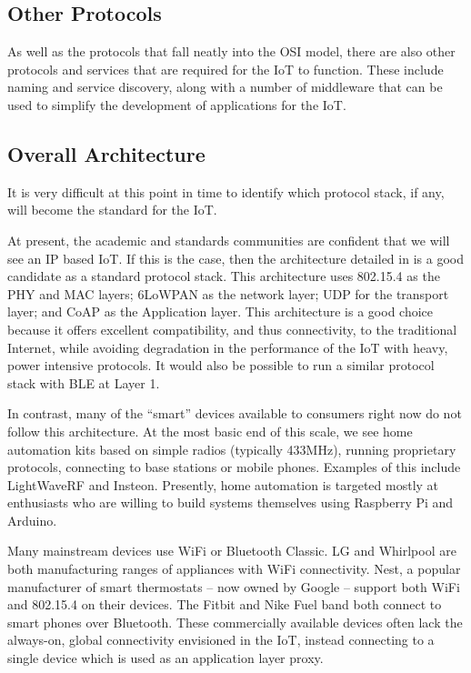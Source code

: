 \documentclass[10pt,journal,compsoc]{IEEEtran}
\begin{document}
\subsection{Other Protocols}
As well as the protocols that fall neatly into the OSI model, there are also
other protocols and services that are required for the IoT to function. These
include naming and service discovery, along with a number of middleware that
can be used to simplify the development of applications for the IoT.

\subsection{Overall Architecture}
It is very difficult at this point in time to identify which protocol stack, if
any, will become the standard for the IoT. 

At present, the academic and standards communities are confident that we will
see an IP based IoT. If this is the case, then the architecture detailed in
\cite{Palattella2013} is a good candidate as a standard protocol stack. This
architecture uses 802.15.4 as the PHY and MAC layers; 6LoWPAN as the network
layer; UDP for the transport layer; and CoAP as the Application layer. This
architecture is a good choice because it offers excellent compatibility, and
thus connectivity, to the traditional Internet, while avoiding degradation in
the performance of the IoT with heavy, power intensive protocols. It would also
be possible to run a similar protocol stack with BLE at Layer 1.  

In contrast, many of the ``smart'' devices available to consumers right now do
not follow this architecture. At the most basic end of this scale, we see home
automation kits based on simple radios (typically 433MHz), running proprietary
protocols, connecting to base stations or mobile phones. Examples of this
include LightWaveRF and Insteon. Presently, home automation is targeted mostly
at enthusiasts who are willing to build systems themselves using Raspberry Pi
and Arduino.  

Many mainstream devices use WiFi or Bluetooth Classic. LG and Whirlpool are
both manufacturing ranges of appliances with WiFi connectivity. Nest, a popular
manufacturer of smart thermostats -- now owned by Google -- support both WiFi
and 802.15.4 on their devices. The Fitbit and Nike Fuel band both connect to
smart phones over Bluetooth. These commercially available devices often lack
the always-on,  global connectivity envisioned in the IoT, instead connecting
to a single device which is used as an application layer proxy.
\end{document}
